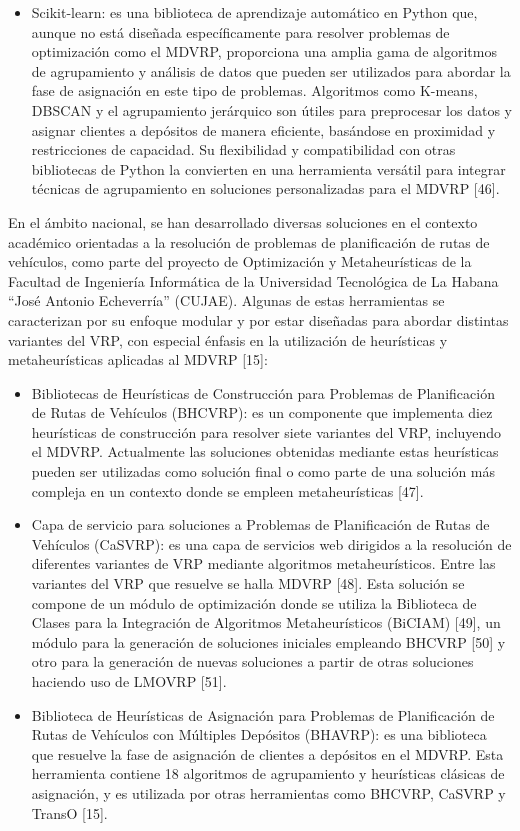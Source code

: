 \begin{itemize}
  \item Scikit-learn: es una biblioteca de aprendizaje autom\'atico en Python que, aunque no est\'a dise\~nada espec\'ificamente para resolver problemas de optimizaci\'on como el MDVRP, proporciona una amplia gama de algoritmos de agrupamiento y an\'alisis de datos que pueden ser utilizados para abordar la fase de asignaci\'on en este tipo de problemas. Algoritmos como K-means, DBSCAN y el agrupamiento jer\'arquico son \'utiles para preprocesar los datos y asignar clientes a dep\'ositos de manera eficiente, bas\'andose en proximidad y restricciones de capacidad. Su flexibilidad y compatibilidad con otras bibliotecas de Python la convierten en una herramienta vers\'atil para integrar t\'ecnicas de agrupamiento en soluciones personalizadas para el MDVRP [46].
\end{itemize}

En el \'ambito nacional, se han desarrollado diversas soluciones en el contexto acad\'emico orientadas a la resoluci\'on de problemas de planificaci\'on de rutas de veh\'iculos, como parte del proyecto de Optimizaci\'on y Metaheur\'isticas de la Facultad de Ingenier\'ia Inform\'atica de la Universidad Tecnol\'ogica de La Habana ``Jos\'e Antonio Echeverr\'ia'' (CUJAE). Algunas de estas herramientas se caracterizan por su enfoque modular y por estar dise\~nadas para abordar distintas variantes del VRP, con especial \'enfasis en la utilizaci\'on de heur\'isticas y metaheur\'isticas aplicadas al MDVRP [15]:

\begin{itemize}
  \item Bibliotecas de Heur\'isticas de Construcci\'on para Problemas de Planificaci\'on de Rutas de Veh\'iculos (BHCVRP): es un componente que implementa diez heur\'isticas de construcci\'on para resolver siete variantes del VRP, incluyendo el MDVRP. Actualmente las soluciones obtenidas mediante estas heur\'isticas pueden ser utilizadas como soluci\'on final o como parte de una soluci\'on m\'as compleja en un contexto donde se empleen metaheur\'isticas [47].
  \item Capa de servicio para soluciones a Problemas de Planificaci\'on de Rutas de Veh\'iculos (CaSVRP): es una capa de servicios web dirigidos a la resoluci\'on de diferentes variantes de VRP mediante algoritmos metaheur\'isticos. Entre las variantes del VRP que resuelve se halla MDVRP [48]. Esta soluci\'on se compone de un m\'odulo de optimizaci\'on donde se utiliza la Biblioteca de Clases para la Integraci\'on de Algoritmos Metaheur\'isticos (BiCIAM) [49], un m\'odulo para la generaci\'on de soluciones iniciales empleando BHCVRP [50] y otro para la generaci\'on de nuevas soluciones a partir de otras soluciones haciendo uso de LMOVRP [51].
  \item Biblioteca de Heur\'isticas de Asignaci\'on para Problemas de Planificaci\'on de Rutas de Veh\'iculos con M\'ultiples Dep\'ositos (BHAVRP): es una biblioteca que resuelve la fase de asignaci\'on de clientes a dep\'ositos en el MDVRP. Esta herramienta contiene 18 algoritmos de agrupamiento y heur\'isticas cl\'asicas de asignaci\'on, y es utilizada por otras herramientas como BHCVRP, CaSVRP y TransO [15].
\end{itemize}

